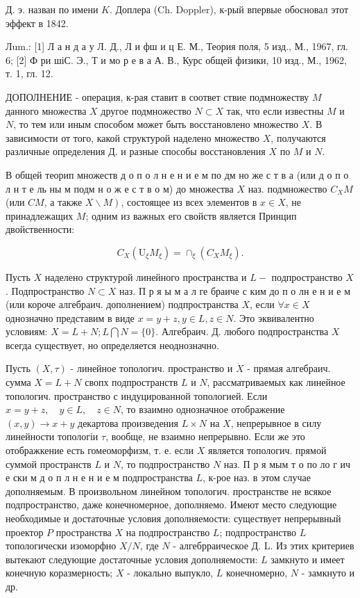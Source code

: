\documentclass[10pt]{article}
\begin{document}
Д. э. назван по имени $K$. Доплера (Ch. Doppler), к-рый впервые обосновал этот эффект в 1842.



Лum.: [1] Л а н д а у Л. Д., Л и фш и ц Е. М., Теория поля, 5 изд., М., 1967, гл. 6; [2] Ф ри шіС. Э., Т и мо р е в а А. В., Курс общей физики, 10 изд., М., 1962, т. 1, гл. 12.



ДОПОЛНЕНИЕ - операция, к-рая ставит в соответ ствие подмножеству $M$ данного множества $X$ другое подмножество $N \subset X$ так, что если известны $M$ и $N$, то тем или иным способом может быть восстановлено множество $X$. В зависимости от того, какой структурой наделено множество $X$, получаются различные определения Д. и разные способы восстановления $X$ по $M$ и $N$.



В общей теорип множеств д о п о л н е н и е м по дм но же с т в а (или д о п о л н т е ль ны м подм н о ж е с т в о м) до множества $X$ наз. подмножество $C_{X} M$ (или $C M$, а также $\left.X \backslash M\right)$, состоящее из всех элементов в $x \in X$, не принадлежащих $M$; одним из важных его свойств является Принцип двойственности:



\[

C_{X}\left(\mathrm{U}_{\xi} M_{\xi}\right)=\cap_{\xi}\left(C_{X} M_{\xi}\right) .

\]



Пусть $X$ наделено структурой линейного пространства и $L-$ подпространство $X$. Подпространство $N \subset X$ наз. П р я ы м а л ге браиче с ким до п о лн е н и е м (или короче алгебраич. дополнением) подпространства $X$, если $\forall x \in X$ однозначно представим в виде $x=y+z, y \in L, z \in N$. Это эквивалентно условиям: $X=L+N ; L \bigcap N=\{0\}$. Алгебраич. Д. любого подпространства $X$ всегда существует, но определяется неоднозначно.



Пусть $(X, \tau)$ - линейное топологич. пространство и $\dot{X}$ - прямая алгебраич. сумма $X=L+N$ свопх подпространств $L$ и $N$, рассматриваемых как линейное топологич. пространство с индуцированной топологией. Если $x=y+z, \quad y \in L, \quad z \in N$, то взаимно однозначное отображение $(x, y) \rightarrow x+y$ декартова произведения $L \times N$ на $X$, непрерывное в силу линейности топологіи $\tau$, вообще, не взаимно непрерывно. Если же это отображкение есть гомеоморфизм, т. е. если $X$ является топологич. прямой суммой пространств $L$ и $N$, то подпространство $N$ наз. П р я мым т о по ло г ич е ски м д о п л н е н и е м подпространства $L$, к-рое наз. в этом случае дополняемым. В произвольном линейном топологич. пространстве не всякое подпространство, даже конечномерное, дополняемо. Имеют место следующие необходимые и достаточные условия дополняемости: существует непрерывный проектор $P$ пространства $X$ на подпространство $L$; подпространство $L$ топологически изоморфно $X / N$, где $N$ - алгебрраическое Д. L. Из этих критериев вытекают следующие достаточные условия дополняемости: $L$ замкнуто и имеет конечную коразмерность; $X$ - локально выпукло, $L$ конечномерно, $N$ - замкнуто и др.
\end{document}
